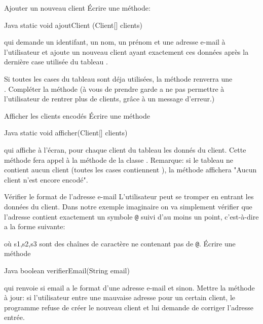\documentclass[a4paper,11pt]{style-esi/td}
\begin{document}
   \begin{Exercice}{Ajouter un nouveau client}
   	 		\'Ecrire une m\'ethode:
		\begin{Code}{Java}
		    static void ajoutClient (Client[] clients)
		\end{Code}
qui demande un identifant, un nom, un pr\'enom et une adresse e-mail \`a l'utilisateur et ajoute un nouveau client ayant exactement ces données apr\`es la derni\`ere case utilis\'ee du tableau .

Si toutes les cases du tableau sont d\'eja utilis\'ees, la m\'ethode renverra une \\. Compl\'eter la m\'ethode  (\`a vous de prendre garde a ne pas permettre \`a l'utilisateur de rentrer plus de  clients, grâce à un message d'erreur.)
				
\end{Exercice}
  
  	\begin{Exercice}{Afficher les clients encod\'es}
	\'Ecrire une m\'ethode
	
		\begin{Code}{Java}
		    static void afficher(Client[] clients)
		\end{Code}
	qui affiche \`a l'\'ecran, pour chaque client du tableau  les donn\'es du client. Cette m\'ethode fera appel \`a la m\'ethode  de la classe . Remarque: si le tableau ne contient aucun client (toutes les cases contiennent ), la m\'ethode affichera "Aucun client n'est encore encod\'e".
		
	\end{Exercice}
	
\begin{Exercice}{V\'erifier le format de l'adresse e-mail}
		L'utilisateur peut se tromper en entrant les donn\'ees du client. Dans notre exemple imaginaire on va simplement v\'erifier que l'adresse contient exactement un symbole \texttt{@} suivi 	d'au moins un point, c'est-à-dire a la forme suivante:
		
	         \begin{center}
                \end{center}
		
		o\`u s1,s2,s3 sont des cha\^ines de caract\`ere ne contenant pas de \texttt{@}. \'Ecrire une m\'ethode 
		
		\begin{Code}{Java}
		boolean verifierEmail(String email)
		\end{Code}
		
		qui renvoie  si email a le format d'une adresse e-mail et  sinon.
		Mettre la m\'ethode  \`a jour: si l'utilisateur entre une mauvaise adresse pour un certain client, le programme refuse de cr\'eer le nouveau client et lui demande de corriger      l'adresse entr\'ee.
	\end{Exercice}
\end{document}
